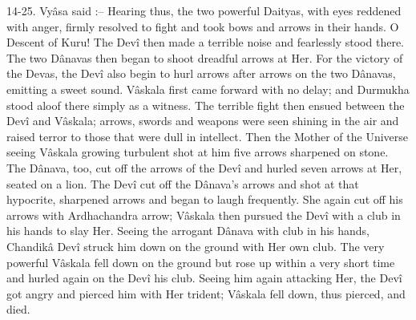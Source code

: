 14-25. Vy\^asa said :-- Hearing thus, the two powerful Daityas, with eyes reddened with anger, firmly resolved to fight and took bows and arrows in their hands. O Descent of Kuru! The Dev\^i then made a terrible noise and fearlessly stood there. The two D\^anavas then began to shoot dreadful arrows at Her. For the victory of the Devas, the Dev\^i also begin to hurl arrows after arrows on the two D\^anavas, emitting a sweet sound. V\^askala first came forward with no delay; and Durmukha stood aloof there simply as a witness. The terrible fight then ensued between the Dev\^i and V\^askala; arrows, swords and weapons were seen shining in the air and raised terror to those that were dull in intellect. Then the Mother of the Universe seeing V\^askala growing turbulent shot at him five arrows sharpened on stone. The D\^anava, too, cut off the arrows of the Dev\^i and hurled seven arrows at Her, seated on a lion. The Dev\^i cut off the D\^anava's arrows and shot at that hypocrite, sharpened arrows and began to laugh frequently. She again cut off his arrows with Ardhachandra arrow; V\^askala then pursued the Dev\^i with a club in his hands to slay Her. Seeing the arrogant D\^anava with club in his hands, Chandik\^a Dev\^i struck him down on the ground with Her own club. The very powerful V\^askala fell down on the ground but rose up within a very short time and hurled again on the Dev\^i his club. Seeing him again attacking Her, the Dev\^i got angry and pierced him with Her trident; V\^askala fell down, thus pierced, and died.

